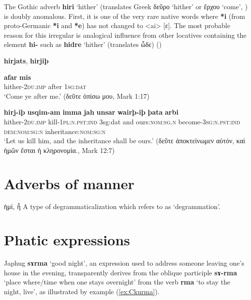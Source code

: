 \documentclass[11pt]{article}
\newcommand{\ipa}[1]{{\phon\textbf{#1}}}
\newcommand{\ipap}[1]{{\phon#1}}
\newcommand{\refb}[1]{(\ref{#1})}
\newcommand{\grec}[1]{{\mleccha #1}}
\begin{document}
The Gothic adverb \ipa{hiri} `hither' (translates Greek \grec{δεῦρο} `hither' or \grec{ἔρχου} `come', \citealt[185; H67]{lehmann86gothic}) is doubly anomalous. First, it is one of the very rare native words where \ipa{*i} (from proto-Germanic \ipa{*i} and \ipa{*e}) has not changed to <ai> [\ipap{ɛ}]. The most probable reason for this irregular is analogical influence from other locatives containing the element \ipa{hi-} such as \ipa{hidre} `hither' (translates \grec{ὧδε}) (\citealt{cercignani84hiri})

 \ipa{hirjats}, \ipa{hirjiþ}
 \citet[104]{braune53gotische}

\begin{exe}
\ex 
\gll \ipa{hirj-ats} \ipa{afar} \ipa{mis} \\
hither-\textsc{2du.imp} after \textsc{1sg:dat} \\
\glt `Come ye after me.' (\grec{δεῦτε ὀπίσω μου}, Mark 1:17)
\end{exe}

\begin{exe}
\ex 
\gll
\ipa{hirj-iþ} \ipa{usqim-am} \ipa{imma} \ipa{jah} \ipa{unsar} \ipa{wairþ-iþ} \ipa{þata} \ipa{arbi} \\
hither-\textsc{2du.imp} kill-\textsc{1pl:n.pst:ind} 3sg:dat and  ours:\textsc{nom:sg.n} become-\textsc{3sg:n.pst:ind} \textsc{dem:nom:sg:n} inheritance:\textsc{nom:sg:n} \\
\glt `Let us kill him, and the inheritance shall be ours.' (\grec{δεῦτε ἀποκτείνωμεν αὐτόν, καὶ ἡμῶν ἔσται ἡ κληρονομία.}, Mark 12:7)
\end{exe}

\citet[415]{osthoff1881morphologische}

\section{Adverbs of manner}

\grec{ἠμί}, \grec{ἦ}
A type of degrammaticalization which \citet[135]{norde09degrammaticalization} refers to as `degrammation'.

\section{Phatic expressions}
Japhug \ipa{sɤrma} `good night', an expression used to address someone leaving one's house in the evening, transparently derives from the oblique participle \ipa{sɤ-rma} `place where/time when one stays overnight' from the verb \ipa{rma} `to stay the night, live', as illustrated by example \refb{ex:Ckurma}.  
\end{document}
